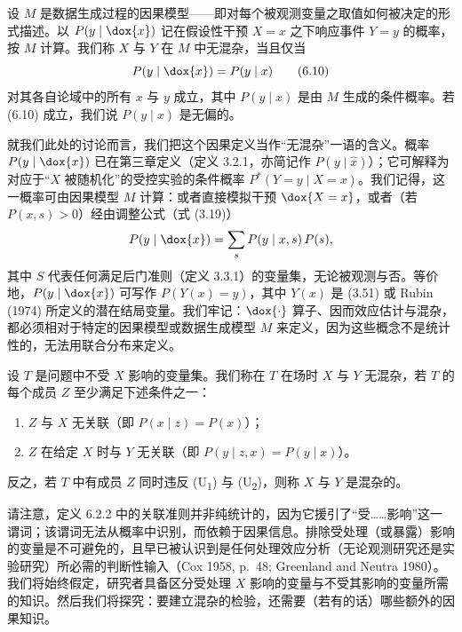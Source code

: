 \begin{definition}
设 $M$ 是数据生成过程的因果模型——即对每个被观测变量之取值如何被决定的形式描述。以 $P(y\mid \dox{x})$ 记在假设性干预 $X=x$ 之下响应事件 $Y=y$ 的概率，按 $M$ 计算。我们称 $X$ 与 $Y$ 在 $M$ 中无混杂，当且仅当
\begin{equation}
P(y\mid \dox{x}) = P(y\mid x) \tag{6.10}
\end{equation}
对其各自论域中的所有 $x$ 与 $y$ 成立，其中 $P(y\mid x)$ 是由 $M$ 生成的条件概率。若 \textup{(6.10)} 成立，我们说 $P(y\mid x)$ 是无偏的。
\end{definition}

就我们此处的讨论而言，我们把这个因果定义当作“无混杂”一语的含义。概率 $P(y\mid \dox{x})$ 已在第三章定义（定义 3.2.1，亦简记作 $P(y\mid \hat{x})$）；它可解释为对应于“$X$ 被随机化”的受控实验的条件概率 $P^*(Y=y\mid X=x)$。我们记得，这一概率可由因果模型 $M$ 计算：或者直接模拟干预 $\dox{X=x}$，或者（若 $P(x,s)>0$）经由调整公式（式 \textup{(3.19)}）
\[
P(y\mid \dox{x}) = \sum_{s} P(y\mid x,s)\,P(s),
\]
其中 $S$ 代表任何满足后门准则（定义 3.3.1）的变量集，无论被观测与否。等价地，$P(y\mid \dox{x})$ 可写作 $P(Y(x)=y)$，其中 $Y(x)$ 是 \textup{(3.51)} 或 Rubin (1974) 所定义的潜在结局变量。我们牢记：$\dox{\cdot}$ 算子、因而效应估计与混杂，都必须相对于特定的因果模型或数据生成模型 $M$ 来定义，因为这些概念不是统计性的，无法用联合分布来定义。

\begin{definition}
设 $T$ 是问题中不受 $X$ 影响的变量集。我们称在 $T$ 在场时 $X$ 与 $Y$ 无混杂，若 $T$ 的每个成员 $Z$ 至少满足下述条件之一：
\begin{enumerate}[label=(\textup{U}\textsubscript{\arabic*}),leftmargin=3.0em]
\item $Z$ 与 $X$ 无关联（即 $P(x\mid z)=P(x)$）；
\item $Z$ 在给定 $X$ 时与 $Y$ 无关联（即 $P(y\mid z,x)=P(y\mid x)$）。
\end{enumerate}
反之，若 $T$ 中有成员 $Z$ 同时违反 (U\textsubscript{1}) 与 (U\textsubscript{2})，则称 $X$ 与 $Y$ 是混杂的。
\end{definition}

请注意，定义 6.2.2 中的关联准则并非纯统计的，因为它援引了“受……影响”这一谓词；该谓词无法从概率中识别，而依赖于因果信息。排除受处理（或暴露）影响的变量是不可避免的，且早已被认识到是任何处理效应分析（无论观测研究还是实验研究）所必需的判断性输入（Cox 1958, p.~48; Greenland and Neutra 1980）。我们将始终假定，研究者具备区分受处理 $X$ 影响的变量与不受其影响的变量所需的知识。然后我们将探究：要建立混杂的检验，还需要（若有的话）哪些额外的因果知识。

